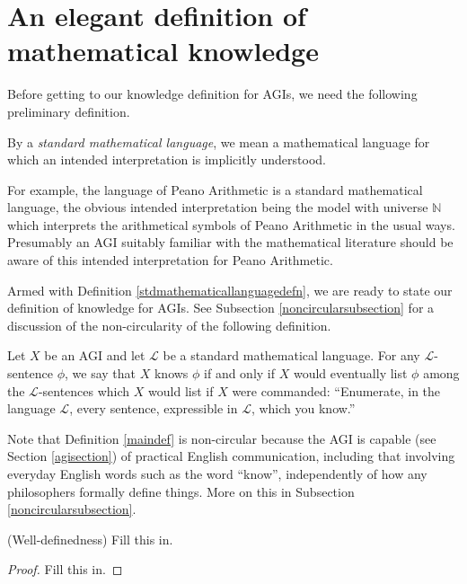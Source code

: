 \documentclass[runningheads]{llncs}
\begin{document}
\section{An elegant definition of mathematical knowledge}
\label{mainsection}

Before getting to our knowledge definition for AGIs, we need the following
preliminary definition.

\begin{definition}
\label{stdmathematicallanguagedefn}
By a \emph{standard mathematical language}, we mean a mathematical language for which an
intended interpretation is implicitly understood.
\end{definition}

For example, the
language of Peano Arithmetic is a standard mathematical language, the obvious
intended interpretation being the model with universe $\mathbb N$ which
interprets the arithmetical symbols of Peano Arithmetic in the usual ways.
Presumably an AGI suitably familiar with the mathematical literature should
be aware of this intended interpretation for Peano Arithmetic.

Armed with Definition \ref{stdmathematicallanguagedefn}, we are ready to state
our definition of knowledge for AGIs.
See Subsection \ref{noncircularsubsection} for a discussion of the non-circularity
of the following definition.

\begin{definition}
\label{maindef}
  Let $X$ be an AGI and let $\mathscr L$ be a standard mathematical language.
  For any $\mathscr L$-sentence $\phi$, we say that $X$
  knows $\phi$ if and only
  if $X$ would eventually list $\phi$ among the $\mathscr L$-sentences which $X$
  would list if $X$ were commanded:
  ``Enumerate, in the language $\mathscr L$, every sentence,
  expressible in $\mathscr L$, which you know.''
\end{definition}

Note that Definition \ref{maindef} is non-circular because
the AGI is capable (see Section \ref{agisection}) of practical English
communication, including that involving everyday English words such as
the word ``know'', independently of how any philosophers formally
define things. More on this in Subsection \ref{noncircularsubsection}.

\begin{theorem}
(Well-definedness) Fill this in.
\end{theorem}

\begin{proof}
  Fill this in.
\end{proof}
\end{document}

